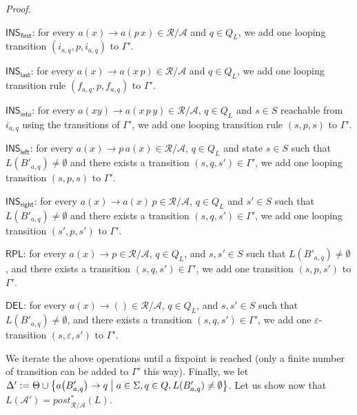 \documentclass[a4paper]{article}
\theoremstyle{plain}
\newenvironment{proof}{\noindent\emph{Proof.}}{}
\newcommand{\R}{\mathcal{R}}
\newcommand{\F}{\Sigma}
\newcommand{\A}{\mathcal{A}}
\newcommand{\ptrs}[2]{{#1}{/}{#2}}
\newcommand{\post}{\mathit{post}}
\newcommand{\INS}{\mathsf{INS}}
\newcommand{\RPL}{\mathsf{RPL}}
\newcommand{\DEL}{\mathsf{DEL}}
\begin{document}
\begin{proof}
\begin{description}
\item{$\INS_\mathsf{first}$:}  for every $a(x) \to a(p\, x) \in \ptrs{\R}{\A}$ 
and $q \in Q_L$, 
we add one looping transition $(i_{a,q}, p, i_{a,q})$ to $\Gamma'$.

\item{$\INS_\mathsf{last}$:}  for every $a(x) \to a(x\, p) \in \ptrs{\R}{\A}$
and $q \in Q_L$, 
we add one looping transition rule
$(f_{a,q}, p, f_{a,q})$ to $\Gamma'$.

\item{$\INS_\mathsf{into}$:}  for every $a(xy) \to a(x\, p\, y) \in \ptrs{\R}{\A}$,
$q \in Q_L$ 
and $s \in S$ reachable from $i_{a,q}$ using the transitions of $\Gamma'$,
we add one looping transition rule $(s, p, s)$ to $\Gamma'$.

\item{$\INS_\mathsf{left}$:} for every $a(x) \to p\, a(x) \in \ptrs{\R}{\A}$, 
$q \in Q_L$ and state $s \in S$ such that 
$L(B'_{a,q}) \neq \emptyset$ and
there exists a transition $(s, q, s') \in \Gamma'$,
we add one looping transition $(s, p, s)$ to $\Gamma'$.

\item{$\INS_\mathsf{right}$:}  for every $a(x) \to a(x)\, p \in \ptrs{\R}{\A}$, 
$q \in Q_L$ and $s' \in S$
such that $L(B'_{a,q}) \neq \emptyset$
and there exists a transition $(s, q, s') \in \Gamma'$,
we add one looping transition $(s', p, s')$ to $\Gamma'$.

\item{$\RPL$:}  for every $a(x) \to p \in \ptrs{\R}{\A}$,
$q \in Q_L$, 
and $s, s' \in S$
such that $L(B'_{a,q}) \neq \emptyset$, 
and there exists a transition $(s, q, s') \in \Gamma'$,
we add one transition $(s, p, s')$ to $\Gamma'$.

\item{$\DEL$:}  for every $a(x) \to () \in \ptrs{\R}{\A}$,
$q \in Q_L$, and $s, s' \in S$
such that $L(B'_{a,q}) \neq \emptyset$, 
and there exists a transition $(s, q, s') \in \Gamma'$,
we add one $\varepsilon$-transition $(s, \varepsilon, s')$ to $\Gamma'$.
\end{description}

We iterate the above operations until a fixpoint is reached
(only a finite number of transition can be added to $\Gamma'$ this way).
Finally, we let 
\( \Delta' := \Theta \cup
\bigl\{ a\bigl(B'_{a, q}\bigr) \to q \bigm| a \in \F, q \in Q, 
              L(B'_{a, q}) \neq \emptyset \bigr\} \).
\noindent Let us show now
that $L(\A') = \post^*_{\ptrs{\R}{\A}}(L)$. 


\end{proof}
\end{document}

